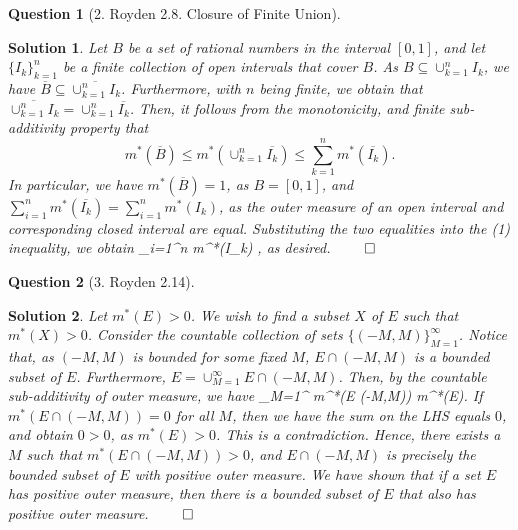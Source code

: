 \documentclass{article} %
\def\eQb#1\eQe{\begin{eqnarray*}#1\end{eqnarray*}}
\theoremstyle{quest}
\newtheorem*{question}{Question}
\newtheorem*{solution}{Solution}
\begin{document}
\begin{question}[2. Royden 2.8. Closure of Finite Union]
\end{question}
\begin{solution}
Let $B$ be a set of rational numbers in the interval $[0,1]$, and let $\{ I_k \}_{k=1}^{n}$ be a 
finite collection of open intervals that cover $B$.
As $B \subseteq \cup_{k=1}^{n} I_k$, we have $\overline{B} \subseteq 
\overline{\cup_{k=1}^{n}I_k}$. Furthermore, with $n$ 
being finite, we obtain that $\overline{\cup_{k=1}^{n} I_k} =
\cup_{k=1}^{n} \overline{I_k}$. Then, it follows from the monotonicity, and finite sub-additivity
property that 
\begin{equation}
m^{*}(\overline{B}) \leq m^{*}( \cup_{k=1}^{n} \overline{ I_k } ) \leq \sum_{k=1}^{n} 
m^{*}(\overline{I_k}).
\end{equation}
In particular, we have $m^{*}(\overline{B}) = 1$, as $B = [0,1]$, and 
$\sum_{i=1}^{n} m^{*}(\overline{I_k}) = \sum_{i=1}^{n} m^{*}(I_k)$, as the outer measure
of an open interval and corresponding closed interval are equal. Substituting the two
equalities into the (1) inequality, we obtain
\eQb
\sum_{i=1}^{n} m^{*}(I_k) ,
\eQe
as desired. $\qed$
\end{solution}

\bigskip

\begin{question}[3. Royden 2.14]
\end{question}
\begin{solution}
Let $m^{*}(E) > 0$. We wish to find a subset $X$ of $E$ such that $m^{*}(X) > 0$. 
Consider the countable collection of sets $\{ (-M,M) \}_{M=1}^{\infty}$. Notice that,
as $(-M,M)$ is bounded for some fixed $M$,
$E \cap (-M,M)$ is a bounded subset of $E$. Furthermore,
$ E = \cup_{M=1}^{\infty} E\cap (-M,M)$.
Then, by the countable sub-additivity of outer measure, we have
\eQb
\sum_{M=1}^{\infty} m^{*}(E \cap (-M,M)) \geq m^{*}(E).
\eQe
If $m^{*}(E \cap (-M,M)) = 0$ for all $M$, then we have the sum on the LHS equals $0$, and obtain
$0 > 0$, as $m^{*}(E) > 0$. This is a contradiction. Hence, there exists a $M$ such that
$m^{*}(E \cap (-M,M)) > 0$, and $E \cap (-M,M)$ is precisely the bounded subset of $E$ with
positive outer measure. We have shown that if a set $E$ has positive outer measure,
then there is a bounded subset of $E$ that also has positive outer measure. $\qed$

\end{solution}

\bigskip
\end{document}
